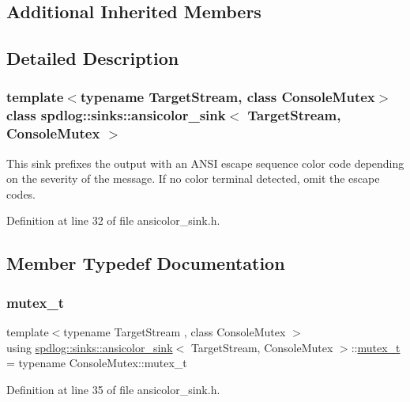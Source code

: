 \subsection*{Additional Inherited Members}


\subsection{Detailed Description}
\subsubsection*{template$<$typename Target\+Stream, class Console\+Mutex$>$\newline
class spdlog\+::sinks\+::ansicolor\+\_\+sink$<$ Target\+Stream, Console\+Mutex $>$}

This sink prefixes the output with an A\+N\+SI escape sequence color code depending on the severity of the message. If no color terminal detected, omit the escape codes. 

Definition at line 32 of file ansicolor\+\_\+sink.\+h.



\subsection{Member Typedef Documentation}
\mbox{\label{classspdlog_1_1sinks_1_1ansicolor__sink_a99718be9a953edac6cae0371bc00fb2f}} 
\subsubsection{\texorpdfstring{mutex\+\_\+t}{mutex\_t}}
{\footnotesize\ttfamily template$<$typename Target\+Stream , class Console\+Mutex $>$ \\
using \hyperlink{classspdlog_1_1sinks_1_1ansicolor__sink}{spdlog\+::sinks\+::ansicolor\+\_\+sink}$<$ Target\+Stream, Console\+Mutex $>$\+::\hyperlink{classspdlog_1_1sinks_1_1ansicolor__sink_a99718be9a953edac6cae0371bc00fb2f}{mutex\+\_\+t} =  typename Console\+Mutex\+::mutex\+\_\+t}



Definition at line 35 of file ansicolor\+\_\+sink.\+h.



